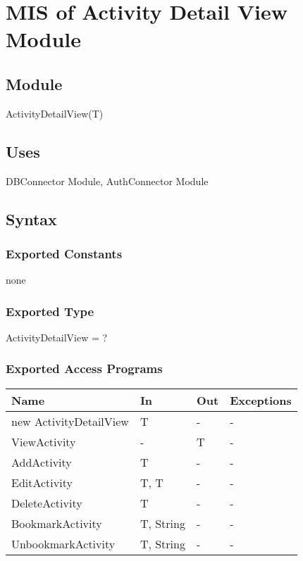 \documentclass[12pt, titlepage]{article}
\begin{document}
\newpage

\section{MIS of Activity Detail View Module} \label{mADV}

\subsection{Module}

ActivityDetailView(T)

\subsection{Uses}

DBConnector Module,  AuthConnector Module

\subsection{Syntax}

\subsubsection{Exported Constants}
none
\subsubsection{Exported Type}
ActivityDetailView = ?

\subsubsection{Exported Access Programs}
\begin{center}
\begin{tabular}{p{4cm} p{2cm} p{4cm} p{4cm}}
\hline
\textbf{Name} & \textbf{In} & \textbf{Out} & \textbf{Exceptions} \\
\hline
new ActivityDetailView & T & - & - \\
ViewActivity & - & T & -\\ 
AddActivity & T & - & - \\
EditActivity & T, T & - & - \\
DeleteActivity & T & - & - \\
BookmarkActivity & T, String & - & - \\
UnbookmarkActivity & T, String & - & - \\
\hline
\end{tabular}
\end{center}
\end{document}
